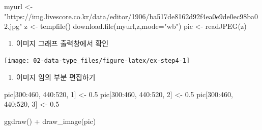 \documentclass[
  11pt,
]{krantz}
\newenvironment{Shaded}{\begin{snugshade}}{\end{snugshade}}
\newcommand{\AttributeTok}[1]{\textcolor[rgb]{0.61,0.61,0.61}{#1}}
\newcommand{\DecValTok}[1]{\textcolor[rgb]{0.06,0.06,0.06}{#1}}
\newcommand{\FloatTok}[1]{\textcolor[rgb]{0.06,0.06,0.06}{#1}}
\newcommand{\FunctionTok}[1]{\textcolor[rgb]{0,0,0}{#1}}
\newcommand{\NormalTok}[1]{#1}
\newcommand{\OtherTok}[1]{\textcolor[rgb]{0.37,0.37,0.37}{#1}}
\newcommand{\SpecialCharTok}[1]{\textcolor[rgb]{0,0,0}{#1}}
\newcommand{\StringTok}[1]{\textcolor[rgb]{0.5,0.5,0.5}{#1}}
\providecommand{\tightlist}{%
  \setlength{\itemsep}{0pt}\setlength{\parskip}{0pt}}
\begin{document}
\footnotesize

\begin{Shaded}
\begin{Highlighting}[]
\NormalTok{myurl }\OtherTok{\textless{}{-}} \StringTok{"https://img.livescore.co.kr/data/editor/1906/ba517de8162d92f4ea0e9de0ec98ba02.jpg"}
\NormalTok{z }\OtherTok{\textless{}{-}} \FunctionTok{tempfile}\NormalTok{()}
\FunctionTok{download.file}\NormalTok{(myurl,z,}\AttributeTok{mode=}\StringTok{"wb"}\NormalTok{)}
\NormalTok{pic }\OtherTok{\textless{}{-}} \FunctionTok{readJPEG}\NormalTok{(z)}
\end{Highlighting}
\end{Shaded}

\normalsize

\begin{enumerate}
\def\labelenumi{\arabic{enumi}.}
\setcounter{enumi}{3}
\tightlist
\item
  이미지 그래프 출력창에서 확인
\end{enumerate}

\footnotesize

\begin{center}\texttt{[image: 02-data-type\_files/figure-latex/ex-step4-1]} \end{center}

\normalsize

\begin{enumerate}
\def\labelenumi{\arabic{enumi}.}
\setcounter{enumi}{4}
\tightlist
\item
  이미지 임의 부분 편집하기
\end{enumerate}

\footnotesize

\begin{Shaded}
\begin{Highlighting}[]
\NormalTok{pic[}\DecValTok{300}\SpecialCharTok{:}\DecValTok{460}\NormalTok{, }\DecValTok{440}\SpecialCharTok{:}\DecValTok{520}\NormalTok{, }\DecValTok{1}\NormalTok{] }\OtherTok{\textless{}{-}} \FloatTok{0.5}
\NormalTok{pic[}\DecValTok{300}\SpecialCharTok{:}\DecValTok{460}\NormalTok{, }\DecValTok{440}\SpecialCharTok{:}\DecValTok{520}\NormalTok{, }\DecValTok{2}\NormalTok{] }\OtherTok{\textless{}{-}} \FloatTok{0.5}
\NormalTok{pic[}\DecValTok{300}\SpecialCharTok{:}\DecValTok{460}\NormalTok{, }\DecValTok{440}\SpecialCharTok{:}\DecValTok{520}\NormalTok{, }\DecValTok{3}\NormalTok{] }\OtherTok{\textless{}{-}} \FloatTok{0.5}

\FunctionTok{ggdraw}\NormalTok{() }\SpecialCharTok{+}
  \FunctionTok{draw\_image}\NormalTok{(pic)}
\end{Highlighting}
\end{Shaded}
\end{document}
